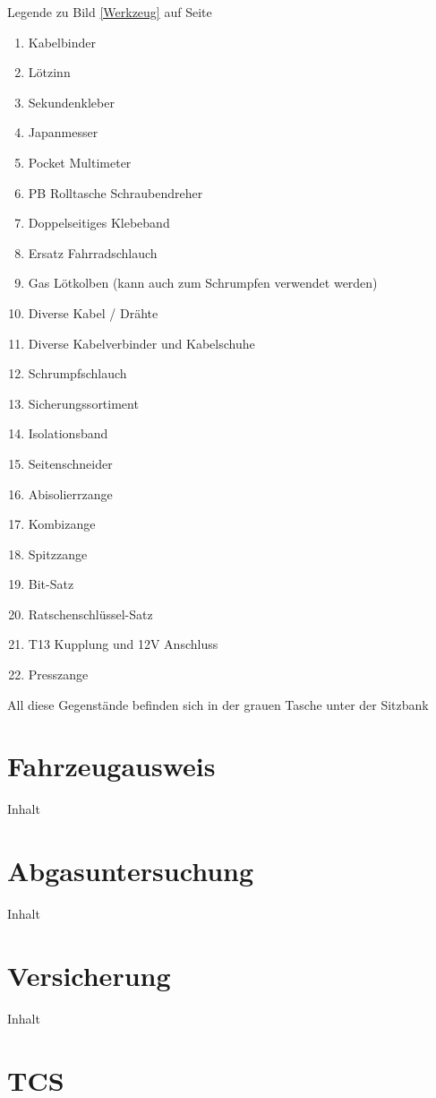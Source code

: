 Legende zu Bild \ref{Werkzeug} auf Seite \pageref{Werkzeug}
\begin{enumerate}
    \item Kabelbinder
    \item Lötzinn
    \item Sekundenkleber
    \item Japanmesser
    \item Pocket Multimeter
    \item PB Rolltasche Schraubendreher
    \item Doppelseitiges Klebeband
    \item Ersatz Fahrradschlauch
    \item Gas Lötkolben (kann auch zum Schrumpfen verwendet werden)
    \item Diverse Kabel / Drähte
    \item Diverse Kabelverbinder und Kabelschuhe
    \item Schrumpfschlauch
    \item Sicherungssortiment
    \item Isolationsband
    \item Seitenschneider
    \item Abisolierrzange
    \item Kombizange
    \item Spitzzange
    \item Bit-Satz
    \item Ratschenschlüssel-Satz
    \item T13 Kupplung und 12V Anschluss
    \item Presszange
\end{enumerate}
All diese Gegenstände befinden sich in der grauen Tasche unter der Sitzbank
\newpage

\section{Fahrzeugausweis}
Inhalt
\section{Abgasuntersuchung}
Inhalt
\section{Versicherung}
Inhalt
\newpage
\section{TCS}
